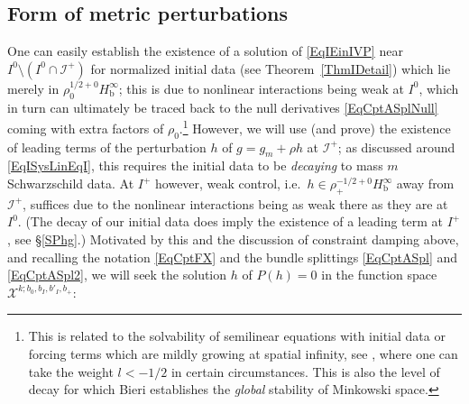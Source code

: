 \documentclass[reqno,11pt,letterpaper]{amsart}
\numberwithin{equation}{section}
\numberwithin{figure}{section}
\theoremstyle{definition}
\theoremstyle{remark}
\newcommand{\mc}{\mathcal}
\newcommand{\cX}{\mc X}
\newcommand{\ms}{\mathscr}
\newcommand{\scri}{\ms I}
\newcommand{\bop}{{\mathrm{b}}}
\newcommand{\Hb}{H_{\bop}}
\begin{document}
\subsection{Form of metric perturbations}
\label{SsEinF}

One can easily establish the existence of a solution of \eqref{EqIEinIVP} near $I^0\setminus(I^0\cap\scri^+)$ for normalized initial data (see Theorem~\ref{ThmIDetail}) which lie merely in $\rho_0^{1/2+0}\Hb^\infty$; this is due to nonlinear interactions being weak at $I^0$, which in turn can ultimately be traced back to the null derivatives \eqref{EqCptASplNull} coming with extra factors of $\rho_0$.\footnote{This is related to the solvability of semilinear equations with initial data or forcing terms which are mildly growing at spatial infinity, see \cite[Theorem~5.14]{HintzVasySemilinear}, where one can take the weight $l<-1/2$ in certain circumstances. This is also the level of decay for which Bieri \cite{BieriZipserStability} establishes the \emph{global} stability of Minkowski space.} However, we will use (and prove) the existence of leading terms of the perturbation $h$ of $g=g_m+\rho h$ at $\scri^+$; as discussed around \eqref{EqISysLinEqI}, this requires the initial data to be \emph{decaying} to mass $m$ Schwarzschild data. At $I^+$ however, weak control, i.e.\ $h\in\rho_+^{-1/2+0}\Hb^\infty$ away from $\scri^+$, suffices due to the nonlinear interactions being as weak there as they are at $I^0$. (The decay of our initial data does imply the existence of a leading term at $I^+$, see \S\ref{SPhg}.) Motivated by this and the discussion of constraint damping above, and recalling the notation \eqref{EqCptFX} and the bundle splittings \eqref{EqCptASpl} and \eqref{EqCptASpl2}, we will seek the solution $h$ of $P(h)=0$ in the function space $\cX^{k;b_0,b_I,b'_I,b_+}$:
\end{document}
